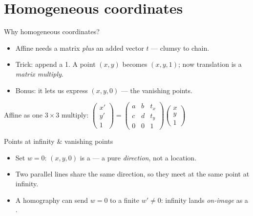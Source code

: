\documentclass[10pt,aspectratio=169]{beamer}
\begin{document}
\section{Homogeneous coordinates}

\begin{frame}{Why homogeneous coordinates?}
  \begin{itemize}
    \item Affine needs a matrix \emph{plus} an added vector $t$ — clumsy to chain.
    \item Trick: append a 1. A point $(x,y)$ becomes $(x,y,1)$; now translation is a \emph{matrix multiply}.
    \item Bonus: it lets us express  $(x,y,0)$ — the vanishing points.
  \end{itemize}
  \begin{mathbox}
    Affine as one $3\times3$ multiply:
    $\begin{pmatrix}x'\\y'\\1\end{pmatrix}=
     \begin{pmatrix}a&b&t_x\\ c&d&t_y\\ 0&0&1\end{pmatrix}
     \begin{pmatrix}x\\y\\1\end{pmatrix}$
  \end{mathbox}
\end{frame}

\begin{frame}{Points at infinity \& vanishing points}
  \begin{itemize}
    \item Set $w=0$: $(x,y,0)$ is a  — a pure \emph{direction}, not a location.
    \item Two parallel lines share the same direction, so they meet at the same point at infinity.
    \item A homography can send $w=0$ to a finite $w'\neq0$: infinity lands \emph{on-image} as a .
  \end{itemize}
\end{frame}
\end{document}

